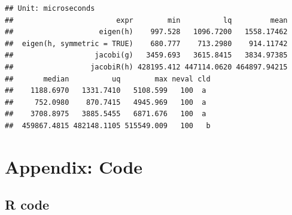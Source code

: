 \documentclass[12pt,]{article}
\begin{document}
\begin{verbatim}
## Unit: microseconds
##                        expr        min          lq         mean
##                    eigen(h)    997.528   1096.7200   1558.17462
##  eigen(h, symmetric = TRUE)    680.777    713.2980    914.11742
##                   jacobi(g)   3459.693   3615.8415   3834.97385
##                  jacobiR(h) 428195.412 447114.0620 464897.94215
##       median          uq        max neval cld
##    1188.6970   1331.7410   5108.599   100  a 
##     752.0980    870.7415   4945.969   100  a 
##    3708.8975   3885.5455   6871.676   100  a 
##  459867.4815 482148.1105 515549.009   100   b
\end{verbatim}

\section{Appendix: Code}\label{appendix-code}

\subsection{R code}\label{r-code}
\end{document}
